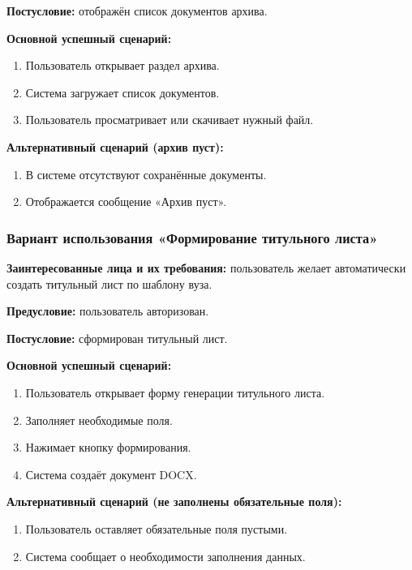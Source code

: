 \textbf{Постусловие:} отображён список документов архива.

\textbf{Основной успешный сценарий:}

\begin{enumerate}
	\item Пользователь открывает раздел архива.
	\item Система загружает список документов.
	\item Пользователь просматривает или скачивает нужный файл.
\end{enumerate}

\textbf{Альтернативный сценарий (архив пуст):}

\begin{enumerate}
	\item В системе отсутствуют сохранённые документы.
	\item Отображается сообщение «Архив пуст».
\end{enumerate}

\subsubsection{Вариант использования «Формирование титульного листа»}

\textbf{Заинтересованные лица и их требования:} пользователь желает автоматически создать титульный лист по шаблону вуза.

\textbf{Предусловие:} пользователь авторизован.

\textbf{Постусловие:} сформирован титульный лист.

\textbf{Основной успешный сценарий:}

\begin{enumerate}
	\item Пользователь открывает форму генерации титульного листа.
	\item Заполняет необходимые поля.
	\item Нажимает кнопку формирования.
	\item Система создаёт документ DOCX.
\end{enumerate}

\textbf{Альтернативный сценарий (не заполнены обязательные поля):}

\begin{enumerate}
	\item Пользователь оставляет обязательные поля пустыми.
	\item Система сообщает о необходимости заполнения данных.
\end{enumerate}

